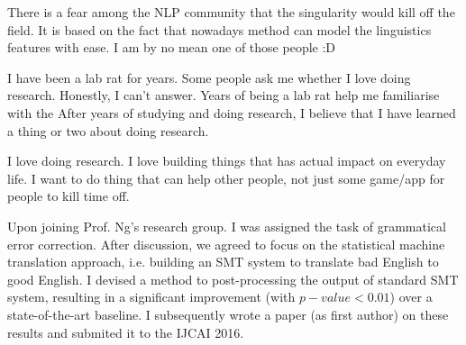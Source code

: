\documentclass[a4paper, 12pt]{scrartcl}
\begin{document}
There is a fear among the NLP community that the singularity would kill off the field. 
It is based on the fact that nowadays method can model the linguistics features with ease. 
I am by no mean one of those people :D



I have been a lab rat for years. 
Some people ask me whether I love doing research. Honestly, I can't answer. 
Years of being a lab rat help me familiarise with the 
After years of studying and doing research, I believe that I have learned a thing or two about doing research. 

I love doing research. 
I love building things that has actual impact on everyday life.
I want to do thing that can help other people, not just some game/app for people to kill time off. 
 




Upon joining Prof. Ng's research group. I was assigned the task of grammatical error correction.
After discussion, we agreed to focus on the statistical machine translation approach, i.e. building an SMT system to translate bad English to good English. 
I devised a method to post-processing the output of standard SMT system, resulting in a significant improvement (with $p-value < 0.01$) over a state-of-the-art baseline. 
I subsequently wrote a paper (as first author) on these results and submited it to the IJCAI 2016.  
\end{document}
